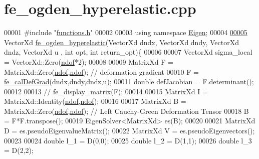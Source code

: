 \hypertarget{fe__ogden__hyperelastic_8cpp_source}{}\section{fe\+\_\+ogden\+\_\+hyperelastic.\+cpp}
\label{fe__ogden__hyperelastic_8cpp_source}

\begin{DoxyCode}
00001 \textcolor{preprocessor}{#include "\hyperlink{functions_8h}{functions.h}"}
00002 
00003 \textcolor{keyword}{using namespace }\hyperlink{namespace_eigen}{Eigen};
00004 
\hyperlink{fe__ogden__hyperelastic_8cpp_ab27ecb703db33cb21a8a6d2fbfbf125f}{00005} VectorXd \hyperlink{fe__ogden__hyperelastic_8cpp_ab27ecb703db33cb21a8a6d2fbfbf125f}{fe\_ogden\_hyperelastic}(VectorXd dndx, VectorXd dndy, VectorXd dndz, VectorXd u
      , \textcolor{keywordtype}{int} opt, \textcolor{keywordtype}{int} return\_opt)\{
00006 
00007     VectorXd sigma\_local = VectorXd::Zero(\hyperlink{_global_variables_8h_aa789fe4d8a13fd0990b630909430d5d0}{ndof}*2);
00008 
00009         MatrixXd F = MatrixXd::Zero(\hyperlink{_global_variables_8h_aa789fe4d8a13fd0990b630909430d5d0}{ndof},\hyperlink{_global_variables_8h_aa789fe4d8a13fd0990b630909430d5d0}{ndof}); \textcolor{comment}{// deformation gradient}
00010         F = \hyperlink{functions_8h_ae50379f74802347e04dbc022897f9cb0}{fe\_calDefGrad}(dndx,dndy,dndz,u);
00011         \textcolor{keywordtype}{double} defJacobian = F.determinant();
00012 
00013         \textcolor{comment}{// fe\_display\_matrix(F);}
00014 
00015         MatrixXd I = MatrixXd::Identity(\hyperlink{_global_variables_8h_aa789fe4d8a13fd0990b630909430d5d0}{ndof},\hyperlink{_global_variables_8h_aa789fe4d8a13fd0990b630909430d5d0}{ndof});
00016 
00017         MatrixXd B = MatrixXd::Zero(\hyperlink{_global_variables_8h_aa789fe4d8a13fd0990b630909430d5d0}{ndof},\hyperlink{_global_variables_8h_aa789fe4d8a13fd0990b630909430d5d0}{ndof}); \textcolor{comment}{// Left Cauchy-Green Deformation Tensor}
00018         B = F*F.transpose();
00019         EigenSolver<MatrixXd> es(B);
00020 
00021         MatrixXd D = es.pseudoEigenvalueMatrix();
00022         MatrixXd V = es.pseudoEigenvectors();
00023 
00024         \textcolor{keywordtype}{double} l\_1 = D(0,0);
00025         \textcolor{keywordtype}{double} l\_2 = D(1,1);
00026         \textcolor{keywordtype}{double} l\_3 = D(2,2);

\end{DoxyCode}
